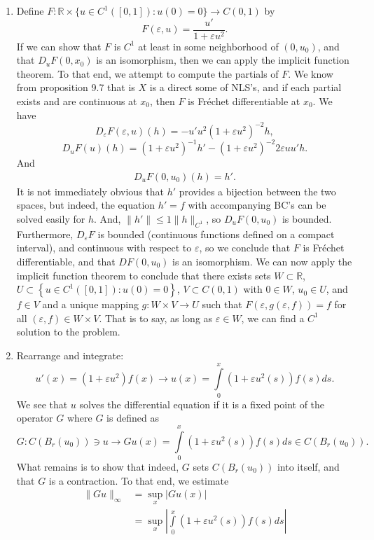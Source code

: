 \documentclass[letterpaper,twoside,11pt]{article}
\theoremstyle{mystyle}
\newcommand{\R}{{\mathbb R}}
\newcommand{\cblu}{\color{blue}}
\newcommand{\inv}{^{-1}}
\newcommand{\ve}{\varepsilon}
\begin{document}
\cblu 
\begin{enumerate}
  \item  Define $F: \R \times \{u \in C^1 \left( [0,1] \right) : u (0) = 0\} \to C(0,1)$ by 
  \[F\left( \ve , u \right) = \frac{u'}{1 + \ve u^2 }.\]
  If we can show that $F$ is $C^1$ at least in some neighborhood of $(0, u_0)$, and that $D_uF(0, x_0)$ is an isomorphism, then we can apply the implicit function theorem. To that end, we attempt to compute the partials of $F$. We know from proposition 9.7 that is $X$ is a direct some of NLS's, and if each partial exists and are continuous at $x_0$, then $F$ is Fr\'echet differentiable at $x_0$. We have 
  \[D_{\ve}F(\ve, u) (h)= - u' u^2 \left( 1 + \ve u^2  \right)^{-2}h,\]
  \[D_uF(u)(h) = \left( 1+ \ve u^2 \right)\inv h' - \left( 1+ \ve u^2  \right)^{-2} 2\ve u u' h.\]
  And 
  \begin{align*}
    D_{u}F(0, u_0)(h) = h'. 
  \end{align*}
  It is not immediately obvious that $h'$ provides a bijection between the two spaces, but indeed, the equation $h' = f$ with accompanying BC's can be solved easily for $h$. And, $\|h'\| \leq 1 \|h\|_{C^1}$, so $D_uF (0, u_0)$ is bounded. Furthermore, $D_{\ve}F$ is bounded (continuous functions defined on a compact interval), and continuous with respect to $\ve$, so we conclude that $F$ is Fr\'echet differentiable, and that $DF(0, u_0)$ is an isomorphism. We can now apply the implicit function theorem to conclude that there exists sets $W \subset \R$, $U \subset \left\{ u \in C^1([0,1]) : u(0) = 0 \right\}$, $V \subset C(0,1)$ with $0 \in W$, $u_0 \in U$, and $f \in V$ and a unique mapping $g : W \times V \to U$ such that $F(\ve, g(\ve, f)) = f$ for all $(\ve, f) \in W \times V$. That is to say, as long as $\ve \in W$, we can find a $C^1$ solution to the problem.  
  \item Rearrange and integrate: 
  \[u'(x) = \left( 1 + \ve u^2  \right)f(x) \longrightarrow u(x) =\int\limits_0^x \left( 1 + \ve u^2(s)  \right)f(s) ds .\]
  We see that $u$ solves the differential equation if it is a fixed point of the operator $G$ where $G$ is defined as 
  \[G: C(B_r(u_0)) \ni u \longrightarrow Gu(x) = \int\limits_0^x \left( 1 + \ve u^2(s)  \right)f(s) ds \in C(B_r(u_0)). \]
  What remains is to show that indeed, $G$ sets $C(B_r(u_0))$ into itself, and that $G$ is a contraction. To that end, we estimate 
  \begin{align*}
    \|Gu\|_{\infty} &= \sup_x |Gu(x)| \\
    &= \sup_x \left\vert \int\limits_0^x \left( 1 + \ve u^2(s)  \right)f(s) ds\right\vert\\

\end{align*}
\end{enumerate}
\end{document}
